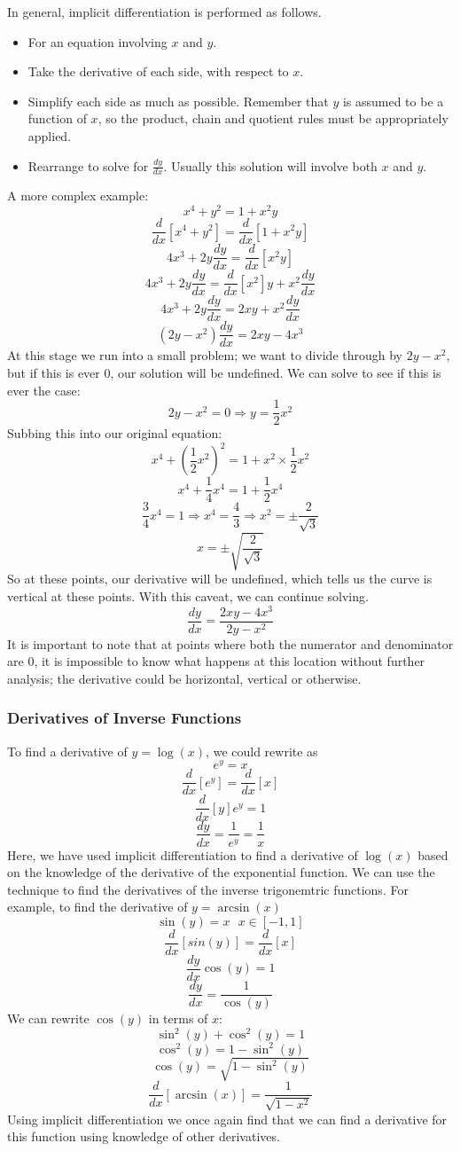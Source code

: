 \documentclass[12pt]{report}
\begin{document}
\begin{flushleft}
\bigskip
In general, implicit differentiation is performed as follows.
\begin{itemize}
    \item For an equation involving \(x\) and \(y\).
    \item Take the derivative of each side, with respect to \(x\).
    \item Simplify each side as much as possible. Remember that \(y\) is 
    assumed to be a function of \(x\), so the product, chain and quotient rules
    must be appropriately applied.
    \item Rearrange to solve for \(\frac{dy}{dx}\). Usually this solution will
    involve both \(x\) and \(y\).
\end{itemize}

A more complex example:
\[x^4 + y^2 = 1 + x^2y\]
\[\frac{d}{dx}[x^4 + y^2] = \frac{d}{dx}[1 + x^2y]\]
\[4x^3 + 2y\frac{dy}{dx} = \frac{d}{dx}[x^2y]\]
\[4x^3 + 2y\frac{dy}{dx} = \frac{d}{dx}[x^2]y + x^2\frac{dy}{dx}\]
\[4x^3 + 2y\frac{dy}{dx} = 2xy + x^2\frac{dy}{dx}\]
\[(2y - x^2)\frac{dy}{dx} = 2xy - 4x^3\]
At this stage we run into a small problem; we want to divide through by 
\(2y - x^2\), but if this is ever \(0\), our solution will be undefined.
We can solve to see if this is ever the case:
\[2y - x^2 = 0 \Rightarrow y = \frac{1}{2}x^2\]
Subbing this into our original equation:
\[x^4 + \left(\frac{1}{2}x^2\right)^2 = 1 + x^2\times\frac{1}{2}x^2\]
\[x^4 + \frac{1}{4}x^4 = 1 + \frac{1}{2}x^4\]
\[\frac{3}{4}x^4 = 1 \Rightarrow x^4 = \frac{4}{3} \Rightarrow x^2 = 
\pm \frac{2}{\sqrt{3}}\]
\[x = \pm \sqrt{\frac{2}{\sqrt{3}}}\]
So at these points, our derivative will be undefined, which tells us the curve
is vertical at these points. With this caveat, we can continue solving.
\[\frac{dy}{dx} = \frac{2xy - 4x^3}{2y - x^2}\]
It is important to note that at points where both the numerator and denominator
are \(0\), it is impossible to know what happens at this location without 
further analysis; the derivative could be horizontal, vertical or otherwise.

\subsubsection*{Derivatives of Inverse Functions}
To find a derivative of \(y = \log(x)\), we could rewrite as
\[e^y = x\]
\[\frac{d}{dx}[e^y] = \frac{d}{dx}[x]\]
\[\frac{d}{dx}[y]e^y = 1\]
\[\frac{dy}{dx} = \frac{1}{e^y} = \frac{1}{x}\]
Here, we have used implicit differentiation to find a derivative of \(\log(x)\)
based on the knowledge of the derivative of the exponential function. We can
use the technique to find the derivatives of the inverse trigonemtric 
functions. For example, to find the derivative of \(y = \arcsin(x)\)
\[\sin(y) = x \:\:\: x \in [-1, 1]\]
\[\frac{d}{dx}[sin(y)] = \frac{d}{dx}[x]\]
\[\frac{dy}{dx}\cos(y) = 1\]
\[\frac{dy}{dx} = \frac{1}{\cos(y)}\]
We can rewrite \(\cos(y)\) in terms of \(x\):
\[\sin^2(y) + \cos^2(y) = 1\]
\[\cos^2(y) = 1 - \sin^2(y)\]
\[\cos(y) = \sqrt{1 - \sin^2(y)}\]
\[\frac{d}{dx}[\arcsin(x)] = \frac{1}{\sqrt{1 - x^2}}\]
Using implicit differentiation we once again find that we can find a derivative
for this function using knowledge of other derivatives.


\end{flushleft}
\end{document}
